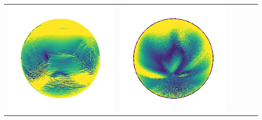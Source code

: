 \begin{tabularx}{\linewidth}{@{}Y@{}Y@{}Y@{}Y@{}Y@{}Y@{}}
\includegraphics[width=\linewidth]{semisynthetic/20150514_13_yu_err.png} &
\includegraphics[width=\linewidth]{semisynthetic/20150514_13_dpsn_err.png} &

\end{tabularx}
